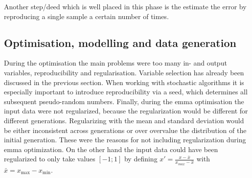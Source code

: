 Another step/deed which is well placed in this phase is the estimate the error by reproducing a single sample a certain number of times. 
%
\subsection{Optimisation, modelling and data generation}
\label{sec:phase3}
During the optimisation the main problems were too many in- and output variables, reproducibility and regularisation. 
Variable selection has already been discussed in the previous section. 
When working with stochastic algorithms it is especially important to introduce reproducibility via a seed, which determines all subsequent pseudo-random numbers. 
Finally, during the \gls{emma} optimisation the input data were not regularized, %
because the regularization would be different for different generations.
Regularizing with the mean and standard deviation would be either inconsistent across generations or over overvalue the distribution of the initial generation. 
%
These were the reasons for not including regularization during \gls{emma} optimization. 
On the other hand the input data could have been regularized to only take values $[-1;1]$ by defining
$x'= \frac{x-\bar{x}}{x_{max} - \bar{x}}$ with $\bar{x}= x_{\text{max}} - x_{\text{min}}$.
\iffalse
\begin{itemize}
    \item regularization
    \item reproducability (random in code and repeat sample)
    \item main problems too many in and output vars
\end{itemize}
\fi
\iffalse
